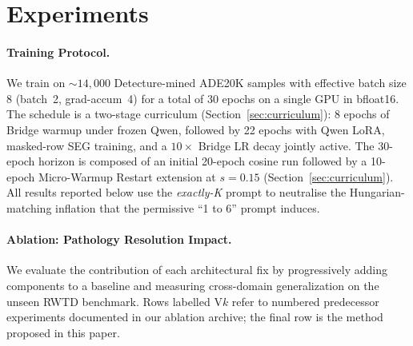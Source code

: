 \documentclass{article}
\begin{document}
\section{Experiments}
\label{sec:experiments}

\paragraph{Training Protocol.}
We train on ${\sim}14{,}000$ Detecture-mined ADE20K samples with effective batch size 8 (batch~2, grad-accum~4) for a total of 30 epochs on a single GPU in bfloat16. The schedule is a two-stage curriculum (Section~\ref{sec:curriculum}): 8 epochs of Bridge warmup under frozen Qwen, followed by 22 epochs with Qwen LoRA, masked-row SEG training, and a $10\times$ Bridge LR decay jointly active. The 30-epoch horizon is composed of an initial 20-epoch cosine run followed by a 10-epoch Micro-Warmup Restart extension at $s = 0.15$ (Section~\ref{sec:curriculum}). All results reported below use the \emph{exactly-K} prompt to neutralise the Hungarian-matching inflation that the permissive ``1 to 6'' prompt induces.

\paragraph{Ablation: Pathology Resolution Impact.}
We evaluate the contribution of each architectural fix by progressively adding components to a baseline and measuring cross-domain generalization on the unseen RWTD benchmark. Rows labelled V$k$ refer to numbered predecessor experiments documented in our ablation archive; the final row is the method proposed in this paper.
\end{document}

